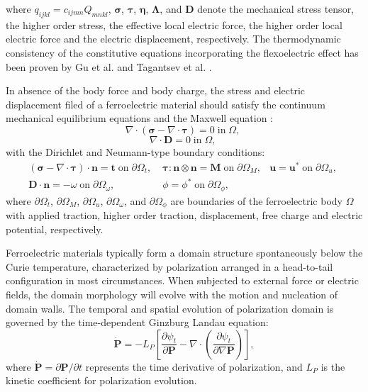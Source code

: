 \documentclass[times,fleqn,11pt]{elsarticle}
\begin{document}
where $q_{ijkl}=c_{ijmn}Q_{mnkl}$, $\mathbf{\sigma}$, $\mathbf{\tau}$, $\mathbf{\eta}$, $ \mathbf{\Lambda}$, and $\mathbf{D}$ denote the mechanical stress tensor, the higher order stress, the effective local electric force, the higher order local electric force and the electric displacement, respectively. The thermodynamic consistency of the constitutive equations incorporating the flexoelectric effect has been proven by Gu et al. \cite{gu_flexoelectricity_2014} and Tagantsev et al. \cite{tagantsev_flexoelectric_2012}.

In absence of the body force and body charge, the stress and electric displacement filed of a ferroelectric material should satisfy the continuum mechanical equilibrium equations and the Maxwell equation \cite{chang_liu_isogeometric_2019}:
\begin{equation}\label{equilibrium}
    \nabla\cdot\left( \mathbf{\sigma}-\nabla\cdot\mathbf{\tau} \right)=0\; \mathrm{in}\; \Omega,\;  
\end{equation}
\begin{equation}\label{Maxwell}
    \nabla \cdot \mathbf{D}=0 \; \mathrm{in}\; \Omega,\;
\end{equation}
with the Dirichlet and Neumann-type boundary conditions:
\begin{equation}
    \begin{split}
         (\mathbf{\sigma}-\nabla\cdot\mathbf{\tau})\cdot \mathbf{n}=\mathbf{t} \;\mathrm{on}\; \partial\Omega_t,\; 
        & \mathbf{\tau}:\mathbf{n}\otimes \mathbf{n} = \mathbf{M} \; \mathrm{on}\; \partial \Omega_M,
        &\mathbf{u}=\mathbf{u}^*\; \mathrm{on}\; \partial\Omega_u, \;\\
         \mathbf{D}\cdot \mathbf{n}=-\omega\;\mathrm{on}\; \partial\Omega_\omega,\;
        &\phi=\phi^* \;\mathrm{on}\; \partial\Omega_\phi,
    \end{split}
\end{equation}
where $\partial\Omega_t$, $\partial\Omega_M$, $\partial\Omega_u$, $\partial\Omega_\omega$, and $\partial\Omega_\phi$ are boundaries of the ferroelectric body $\Omega$ with applied traction, higher order traction, displacement, free charge and electric potential, respectively.

Ferroelectric materials typically form a domain structure spontaneously below the Curie temperature, characterized by polarization arranged in a head-to-tail configuration in most circumstances. When subjected to external force or electric fields, the domain morphology will evolve with the motion and nucleation of domain walls. The temporal and spatial evolution of polarization domain is governed by the time-dependent Ginzburg Landau equation:
\begin{equation}\label{TDGL}
    \dot{\mathbf{P}}=-L_P\left[ \frac{\partial \psi_t}{\partial \mathbf{P}}-\nabla \cdot \left( \frac{\partial\psi_t}{\partial \nabla\mathbf{P}} \right) \right],
\end{equation}
where $\dot{\mathbf{P}}=\partial \mathbf{P}/\partial t$ represents the time derivative of polarization, and $L_P$ is the kinetic coefficient for polarization evolution. 
\end{document}
